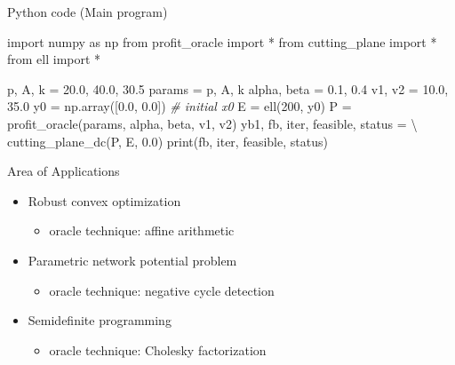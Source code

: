 \documentclass[10pt,ignorenonframetext,serif,onlymath]{beamer}
\newenvironment{Shaded}{}{}
\newcommand{\BuiltInTok}[1]{#1}
\newcommand{\CommentTok}[1]{\textcolor[rgb]{0.38,0.63,0.69}{\textit{#1}}}
\newcommand{\DecValTok}[1]{\textcolor[rgb]{0.25,0.63,0.44}{#1}}
\newcommand{\FloatTok}[1]{\textcolor[rgb]{0.25,0.63,0.44}{#1}}
\newcommand{\ImportTok}[1]{#1}
\newcommand{\NormalTok}[1]{#1}
\newcommand{\OperatorTok}[1]{\textcolor[rgb]{0.40,0.40,0.40}{#1}}
\providecommand{\tightlist}{%
  \setlength{\itemsep}{0pt}\setlength{\parskip}{0pt}}
\begin{document}
\begin{frame}{Python code (Main program)}
\protect\hypertarget{python-code-main-program}{}

\begin{Shaded}
\begin{Highlighting}[]
\ImportTok{import}\NormalTok{ numpy }\ImportTok{as}\NormalTok{ np}
\ImportTok{from}\NormalTok{ profit_oracle }\ImportTok{import} \OperatorTok{*}
\ImportTok{from}\NormalTok{ cutting_plane }\ImportTok{import} \OperatorTok{*}
\ImportTok{from}\NormalTok{ ell }\ImportTok{import} \OperatorTok{*}

\NormalTok{p, A, k }\OperatorTok{=} \FloatTok{20.0}\NormalTok{, }\FloatTok{40.0}\NormalTok{, }\FloatTok{30.5}
\NormalTok{params }\OperatorTok{=}\NormalTok{ p, A, k}
\NormalTok{alpha, beta }\OperatorTok{=} \FloatTok{0.1}\NormalTok{, }\FloatTok{0.4}
\NormalTok{v1, v2 }\OperatorTok{=} \FloatTok{10.0}\NormalTok{, }\FloatTok{35.0}
\NormalTok{y0 }\OperatorTok{=}\NormalTok{ np.array([}\FloatTok{0.0}\NormalTok{, }\FloatTok{0.0}\NormalTok{])  }\CommentTok{# initial x0}
\NormalTok{E }\OperatorTok{=}\NormalTok{ ell(}\DecValTok{200}\NormalTok{, y0)}
\NormalTok{P }\OperatorTok{=}\NormalTok{ profit_oracle(params, alpha, beta, v1, v2)}
\NormalTok{yb1, fb, }\BuiltInTok{iter}\NormalTok{, feasible, status }\OperatorTok{=} \OperatorTok{\textbackslash{}}
\NormalTok{    cutting_plane_dc(P, E, }\FloatTok{0.0}\NormalTok{)}
\BuiltInTok{print}\NormalTok{(fb, }\BuiltInTok{iter}\NormalTok{, feasible, status)}
\end{Highlighting}
\end{Shaded}

\end{frame}

\begin{frame}{Area of Applications}
\protect\hypertarget{area-of-applications}{}

\begin{itemize}
\tightlist
\item
  Robust convex optimization

  \begin{itemize}
  \tightlist
  \item
    oracle technique: affine arithmetic
  \end{itemize}
\item
  Parametric network potential problem

  \begin{itemize}
  \tightlist
  \item
    oracle technique: negative cycle detection
  \end{itemize}
\item
  Semidefinite programming

  \begin{itemize}
  \tightlist
  \item
    oracle technique: Cholesky factorization
  \end{itemize}
\end{itemize}

\end{frame}
\end{document}
